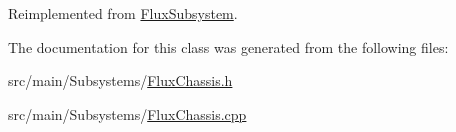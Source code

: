 Reimplemented from \hyperlink{classFluxSubsystem_a327d76affc60699bfa62563e364e42f5}{Flux\+Subsystem}.



The documentation for this class was generated from the following files\+:\begin{DoxyCompactItemize}
\item 
src/main/\+Subsystems/\hyperlink{FluxChassis_8h}{Flux\+Chassis.\+h}\item 
src/main/\+Subsystems/\hyperlink{FluxChassis_8cpp}{Flux\+Chassis.\+cpp}\end{DoxyCompactItemize}
